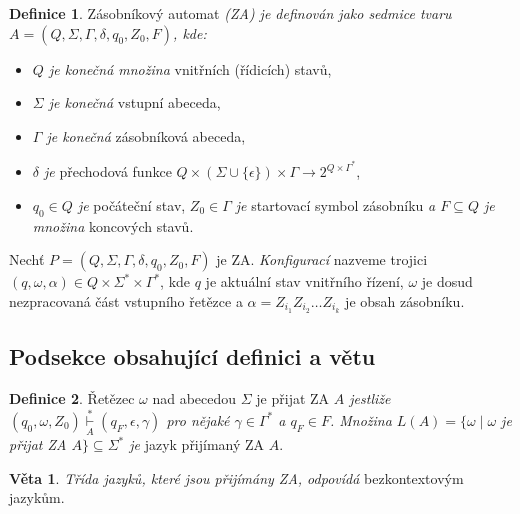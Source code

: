 \documentclass[11pt, a4paper, twocolumn]{article}
\theoremstyle{definition}
\newtheorem{definice}{Definice}
\newtheorem{veta}{Věta}
\begin{document}
\medskip

\begin{definice} \label{definice1}
Zásobníkový automat \emph{(ZA) je definován jako sedmice tvaru $A = (Q, \Sigma, \Gamma, \delta, q_0, Z_0, F)$, kde:} 

\medskip

\begin{itemize} \setlength \itemsep{1em} %
    \item \emph{$Q$ je konečná množina} vnitřních (řídicích) stavů,
    \item \emph{$\Sigma$ je konečná} vstupní abeceda,
    \item \emph{$\Gamma$ je konečná} zásobníková abeceda,
    \item \emph{$\delta$ je} přechodová funkce $Q \times (\Sigma\cup\{\epsilon\}) \times \Gamma \rightarrow 2^{Q \times \Gamma^*}$,
    \item \emph{$q_0 \in Q$ je} počáteční stav, \emph{$Z_0 \in \Gamma$ je} startovací symbol zásobníku \emph{a $F \subseteq Q$ je množina} koncových stavů.
\end{itemize}

\medskip

Nechť $P = (Q, \Sigma, \Gamma, \delta, q_0, Z_0, F)$ je ZA. \emph{Konfigurací} nazveme trojici $(q, \omega, \alpha) \in Q \times \Sigma^* \times \Gamma^*$, kde $q$ je aktuální stav vnitřního řízení, $\omega$ je dosud nezpracovaná část vstup\-ní\-ho řetězce a $\alpha = Z_{i_1} Z_{i_2} \dots Z_{i_k}$ je obsah zásobníku.
\end{definice}

\subsection{Podsekce obsahující definici a větu}

\begin{definice}
    Řetězec $\omega$ nad abecedou $\Sigma$ je přijat ZA \emph{$A$ jest\-li\-že $(q_0, \omega, Z_0) \overset{\ast}{\underset{A}{\vdash}} (q_F, \epsilon, \gamma)$ pro nějaké $\gamma \in \Gamma^*$ a $q_F \in F$. Množina $L(A) = \{\omega \mid \omega$ je přijat ZA $A\} \subseteq \Sigma^*$ je} jazyk přijímaný ZA $A$.
\end{definice}

\medskip

\begin{veta}
    \emph{Třída jazyků, které jsou přijímány ZA, odpovídá} bezkontextovým jazykům.
\end{veta}
\end{document}
